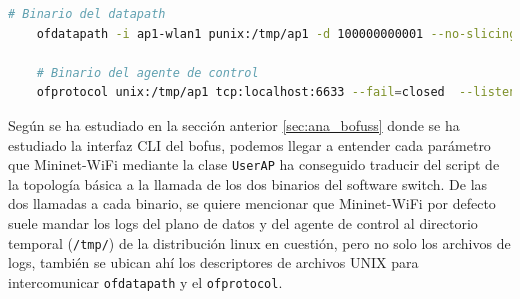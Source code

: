 \begin{lstlisting}[language= bash, style=Consola, caption={Puesta en marcha del BOFUSS},label=code:bofussLaunch]
    # Binario del datapath 
    ofdatapath -i ap1-wlan1 punix:/tmp/ap1 -d 100000000001 --no-slicing 1> /tmp/ap1-ofd.log 2> /tmp/ap1-ofd.log 
   
    # Binario del agente de control
    ofprotocol unix:/tmp/ap1 tcp:localhost:6633 --fail=closed  --listen=punix:/tmp/ap1.listen 1> /tmp/ap1-ofp.log 2>/tmp/ap1-ofp.log 
\end{lstlisting}
\vspace{0.5cm}

Según se ha estudiado en la sección anterior \ref{sec:ana_bofuss} donde se ha estudiado la interfaz CLI del \gls{bofus}, podemos llegar a entender cada parámetro que Mininet-WiFi mediante la clase \texttt{UserAP} ha conseguido traducir del script de la topología básica a la llamada de los dos binarios del software switch.  De las dos llamadas a cada binario, se quiere mencionar que Mininet-WiFi por defecto suele mandar los logs del plano de datos y del agente de control al directorio temporal (\texttt{/tmp/}) de la distribución linux en cuestión, pero no solo los archivos de logs, también se ubican ahí los descriptores de archivos UNIX para intercomunicar \texttt{ofdatapath} y el \texttt{ofprotocol}.

